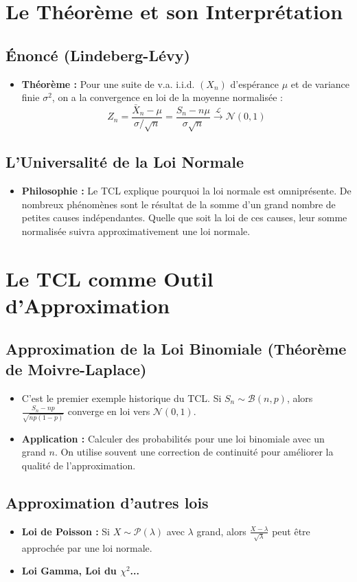 \documentclass[12pt, a4paper, parskip=full]{report}
\theoremstyle{agregstyle}
\begin{document}
\section{Le Théorème et son Interprétation}
\subsection{Énoncé (Lindeberg-Lévy)}
\begin{itemize}
    \item \textbf{Théorème :} Pour une suite de v.a. i.i.d. $(X_n)$ d'espérance $\mu$ et de variance finie $\sigma^2$, on a la convergence en loi de la moyenne normalisée :
    $$ Z_n = \frac{\bar{X}_n - \mu}{\sigma/\sqrt{n}} = \frac{S_n - n\mu}{\sigma\sqrt{n}} \xrightarrow{\mathcal{L}} \mathcal{N}(0,1) $$
\end{itemize}
\subsection{L'Universalité de la Loi Normale}
\begin{itemize}
    \item \textbf{Philosophie :} Le TCL explique pourquoi la loi normale est omniprésente. De nombreux phénomènes sont le résultat de la somme d'un grand nombre de petites causes indépendantes. Quelle que soit la loi de ces causes, leur somme normalisée suivra approximativement une loi normale.
\end{itemize}

\section{Le TCL comme Outil d'Approximation}
\subsection{Approximation de la Loi Binomiale (Théorème de Moivre-Laplace)}
\begin{itemize}
    \item C'est le premier exemple historique du TCL. Si $S_n \sim \mathcal{B}(n,p)$, alors $\frac{S_n - np}{\sqrt{np(1-p)}}$ converge en loi vers $\mathcal{N}(0,1)$.
    \item \textbf{Application :} Calculer des probabilités pour une loi binomiale avec un grand $n$. On utilise souvent une correction de continuité pour améliorer la qualité de l'approximation.
\end{itemize}
\subsection{Approximation d'autres lois}
\begin{itemize}
    \item \textbf{Loi de Poisson :} Si $X \sim \mathcal{P}(\lambda)$ avec $\lambda$ grand, alors $\frac{X-\lambda}{\sqrt{\lambda}}$ peut être approchée par une loi normale.
    \item \textbf{Loi Gamma, Loi du $\chi^2$...}
\end{itemize}
\end{document}

